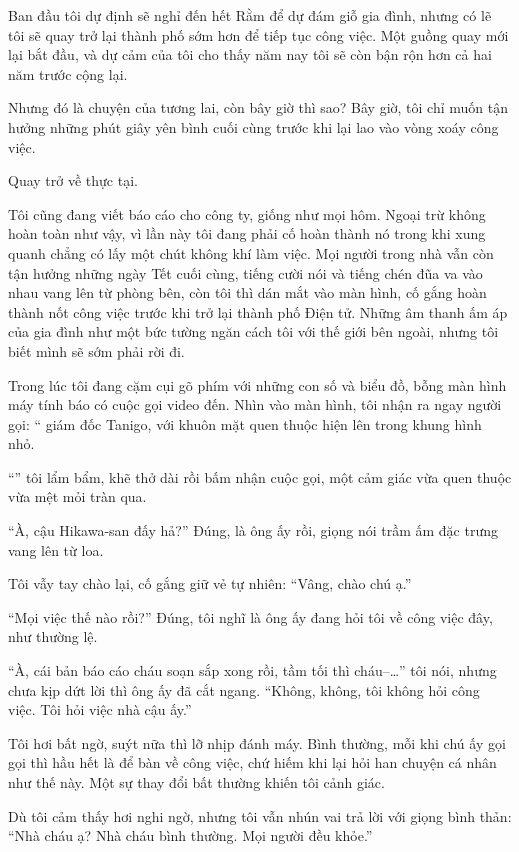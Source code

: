 \documentclass[../main.tex]{subfiles}
\begin{document}
Ban đầu tôi dự định sẽ nghỉ đến hết Rằm để dự đám giỗ gia đình, nhưng có lẽ tôi sẽ quay trở lại thành phố sớm hơn để tiếp tục công việc. Một guồng quay mới lại bắt đầu, và dự cảm của tôi cho thấy năm nay tôi sẽ còn bận rộn hơn cả hai năm trước cộng lại.

Nhưng đó là chuyện của tương lai, còn bây giờ thì sao? Bây giờ, tôi chỉ muốn tận hưởng những phút giây yên bình cuối cùng trước khi lại lao vào vòng xoáy công việc.

\il

Quay trở về thực tại.

Tôi cũng đang viết báo cáo cho công ty, giống như mọi hôm. Ngoại trừ không hoàn toàn như vậy, vì lần này tôi đang phải cố hoàn thành nó trong khi xung quanh chẳng có lấy một chút không khí làm việc. Mọi người trong nhà vẫn còn tận hưởng những ngày Tết cuối cùng, tiếng cười nói và tiếng chén đũa va vào nhau vang lên từ phòng bên, còn tôi thì dán mắt vào màn hình, cố gắng hoàn thành nốt công việc trước khi trở lại thành phố Điện tử. Những âm thanh ấm áp của gia đình như một bức tường ngăn cách tôi với thế giới bên ngoài, nhưng tôi biết mình sẽ sớm phải rời đi.

Trong lúc tôi đang cặm cụi gõ phím với những con số và biểu đồ, bỗng màn hình máy tính báo có cuộc gọi video đến. Nhìn vào màn hình, tôi nhận ra ngay người gọi: `` giám đốc Tanigo, với khuôn mặt quen thuộc hiện lên trong khung hình nhỏ.

``'' tôi lẩm bẩm, khẽ thở dài rồi bấm nhận cuộc gọi, một cảm giác vừa quen thuộc vừa mệt mỏi tràn qua.

``À, cậu Hikawa-san đấy hả?'' Đúng, là ông ấy rồi, giọng nói trầm ấm đặc trưng vang lên từ loa.

Tôi vẫy tay chào lại, cố gắng giữ vẻ tự nhiên: ``Vâng, chào chú ạ.''

``Mọi việc thế nào rồi?'' Đúng, tôi nghĩ là ông ấy đang hỏi tôi về công việc đây, như thường lệ.

``À, cái bản báo cáo cháu soạn sắp xong rồi, tầm tối thì cháu--\dots'' tôi nói, nhưng chưa kịp dứt lời thì ông ấy đã cắt ngang. ``Không, không, tôi không hỏi công việc. Tôi hỏi việc nhà cậu ấy.''

Tôi hơi bất ngờ, suýt nữa thì lỡ nhịp đánh máy. Bình thường, mỗi khi chú ấy gọi gọi thì hầu hết là để bàn về công việc, chứ hiếm khi lại hỏi han chuyện cá nhân như thế này. Một sự thay đổi bất thường khiến tôi cảnh giác.

Dù tôi cảm thấy hơi nghi ngờ, nhưng tôi vẫn nhún vai trả lời với giọng bình thản: ``Nhà cháu ạ? Nhà cháu bình thường. Mọi người đều khỏe.''
\end{document}
